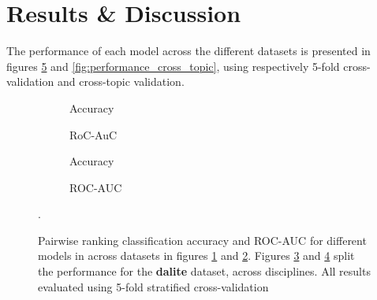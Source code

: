 \documentclass[runningheads]{llncs}
\begin{document}
\section{Results \& Discussion}

The performance of each model across the different datasets is presented 
in figures \ref{fig:performance_k_fold} and \ref{fig:performance_cross_topic}, 
using respectively 5-fold cross-validation and cross-topic validation.  

\begin{figure}
	\begin{subfigure}[t]{0.5\linewidth}
		\centering
		\scalebox{0.4}{}
		\caption{Accuracy}
		\label{fig:acc_kfold}
	\end{subfigure}%
	\qquad
	\begin{subfigure}[t]{0.5\linewidth}
		\centering
		\scalebox{0.4}{}
		\caption{RoC-AuC}
		\label{fig:AUC_kfold}
	\end{subfigure}
	
	\begin{subfigure}[t]{0.5\linewidth}
		\centering
		\scalebox{0.4}{}
		\caption{Accuracy}
		\label{fig:acc_dalite_kfold}
	\end{subfigure}%
	\qquad
	\begin{subfigure}[t]{0.5\linewidth}
		\centering
		\scalebox{0.4}{}
		\caption{ROC-AUC}
		\label{fig:AUC_dalite_kfold}
	\end{subfigure}	
	\caption{Pairwise ranking classification accuracy and ROC-AUC for 
		different models in across datasets in figures \ref{fig:acc_kfold} and 
		\ref{fig:AUC_kfold}. Figures \ref{fig:acc_dalite_kfold} and 
		\ref{fig:AUC_dalite_kfold} split the performance for the  
		\textbf{dalite} dataset, across disciplines. 
		All results evaluated using 5-fold stratified cross-validation}.
	\label{fig:performance_k_fold}
\end{figure}
\end{document}
